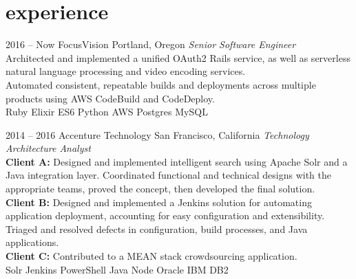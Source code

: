 \documentclass[]{friggeri-cv} %
\begin{document}
\section{experience}

\begin{entrylist}


\entry
{2016 -- Now}
{FocusVision}
{Portland, Oregon}
{\emph{Senior Software Engineer} \\
    Architected and implemented a unified OAuth2 Rails service, as well as serverless natural language processing and video encoding services.
    \\
    Automated consistent, repeatable builds and deployments across multiple products using AWS CodeBuild and CodeDeploy.
    \\
Ruby \mydot Elixir \mydot ES6 \mydot Python \mydot AWS \mydot Postgres \mydot MySQL}

\entry
{2014 -- 2016}
{Accenture Technology}
{San Francisco, California}
{\emph{Technology Architecture Analyst} \\
    \textbf{Client A:} Designed and implemented intelligent search using Apache Solr and a Java integration layer. Coordinated functional and technical designs with the appropriate teams, proved the concept, then developed the final solution.
    \\
    \textbf{Client B:} Designed and implemented a Jenkins solution for automating application deployment, accounting for easy configuration and extensibility. Triaged and resolved defects in configuration, build processes, and Java applications.
    \\
    \textbf{Client C:} Contributed to a MEAN stack crowdsourcing application. \\
Solr \mydot Jenkins \mydot PowerShell \mydot Java \mydot Node \mydot Oracle \mydot IBM DB2}


\end{entrylist}
\end{document}
